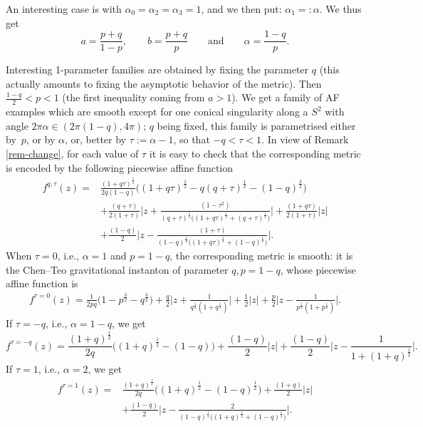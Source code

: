 \documentclass[10pt,a4paper]{amsart}
\numberwithin{equation}{section}
\begin{document}
 \begin{pc} \label{pc-AF2} An interesting case is with $\alpha _0 = \alpha_2 = \alpha _3 = 1$, and we then put: $\alpha _1 =: \alpha$. We thus get
 \[ a = \frac{p + q}{1 - p}, \qquad b = \frac{p + q}{p} \qquad \text{and}\qquad \alpha = \frac{1 - q}{p}. \]

 Interesting 1-parameter families are obtained by fixing the parameter $q$ (this actually amounts to fixing the asymptotic behavior of the metric). Then $\frac{1-q}2<p<1$ (the first inequality coming from $a>1$). We get a family of AF examples which are smooth except for one conical singularity along a $S^2$ with angle $2\pi\alpha\in(2\pi(1-q),4\pi)$; $q$ being fixed, this family is parametrised either by~$p$, or by $\alpha$, or, better by $\tau := \alpha - 1$, so that $- q < \tau < 1$. In view of Remark \ref{rem-change}, for each value of $\tau$ it is easy to check that the corresponding metric is encoded by the following piecewise affine function
 \begin{align*} f ^{q, \tau} (z) ={} & \frac{(1 + q \tau)^{\frac{1}{2}}}{2 q (1 - q)} \big((1 + q \tau)^{\frac{1}{2}} - q (q + \tau)^{\frac{1}{2}} - (1 - q) ^{\frac{3}{2}}\big) \\ & + \frac{(q + \tau)}{2 (1 + \tau)} \bigg|z + \frac{(1 - \tau ^2)}{(q + \tau) ^{\frac{1}{2}} \big((1 + q \tau) ^{\frac{1}{2}} + (q + \tau)^{\frac{1}{2}}\big)}\bigg| + \frac{(1 + q \tau)}{2 (1 + \tau)} |z| \\ & + \frac{(1 - q)}{2} \bigg\vert z - \frac{(1 + \tau)}{(1 - q) ^{\frac{1}{2}} \big((1 + q \tau)^{\frac{1}{2}} + (1 - q)^{\frac{1}{2}}\big)}\bigg\vert.
\end{align*}
 When $\tau = 0$, i.e., $\alpha = 1$ and $p = 1 - q$, the corresponding metric is smooth: it is the Chen--Teo gravitational instanton of parameter $q, p = 1 - q$, whose piecewise affine function is
 \begin{gather*} f ^{\tau = 0} (z) = \frac{1}{2 p q} \big(1 - p ^{\frac{3}{2}} - q ^{\frac{3}{2}}\big) + \frac{q}{2} \bigg|z + \frac{1}{q ^{\frac{1}{2}} (1 + q ^{\frac{1}{2}})}\bigg| + \frac{1}{2} |z| + \frac{p}{2} \bigg|z - \frac{1}{p ^{\frac{1}{2}} (1 + p ^{\frac{1}{2}})}\bigg|. \end{gather*}
 If $\tau = -q$, i.e., $\alpha = 1 - q$, we get
 \[ f ^{\tau = - q} (z) = \frac{(1 + q)^{\frac{1}{2}}}{2 q} \big((1 + q) ^{\frac{1}{2}} - (1 - q)\big) + \frac{(1 - q)}{2} |z|
 + \frac{(1 - q)}{2} \bigg|z - \frac{1}{1 + (1 + q) ^{\frac{1}{2}}}\bigg|. \]
 If $\tau = 1$, i.e., $\alpha = 2$, we get
 \begin{align*} f^{\tau = 1} (z) ={} & \frac{(1 + q) ^{\frac{1}{2}}}{2 q} \big((1 + q) ^{\frac{1}{2}} - (1 - q)^{\frac{1}{2}}\big) + \frac{(1 + q)}{2} \vert z\vert \\ & + \frac{(1 - q)}{2} \bigg\vert z - \frac{2}{(1 - q) ^{\frac{1}{2}} \big((1 + q) ^{\frac{1}{2}} + (1 - q)^{\frac{1}{2}}\big)}\bigg\vert.

\end{align*}
\end{pc}
\end{document}
